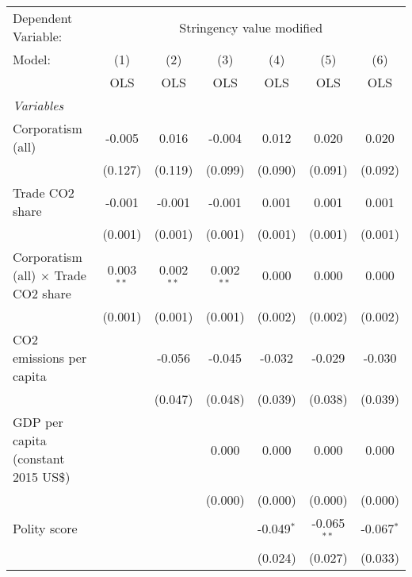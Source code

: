 
\begingroup
\centering
\begin{tabular}{lcccccc}
   \toprule
   Dependent Variable: & \multicolumn{6}{c}{Stringency value modified}\\
   Model:                                      & (1)          & (2)          & (3)          & (4)          & (5)           & (6)\\  
                                               &  OLS         & OLS          & OLS          & OLS          & OLS           & OLS\\  
   \midrule
   \emph{Variables}\\
   Corporatism (all)                           & -0.005       & 0.016        & -0.004       & 0.012        & 0.020         & 0.020\\   
                                               & (0.127)      & (0.119)      & (0.099)      & (0.090)      & (0.091)       & (0.092)\\   
   Trade CO2 share                             & -0.001       & -0.001       & -0.001       & 0.001        & 0.001         & 0.001\\   
                                               & (0.001)      & (0.001)      & (0.001)      & (0.001)      & (0.001)       & (0.001)\\   
   Corporatism (all) $\times$ Trade CO2 share  & 0.003$^{**}$ & 0.002$^{**}$ & 0.002$^{**}$ & 0.000        & 0.000         & 0.000\\   
                                               & (0.001)      & (0.001)      & (0.001)      & (0.002)      & (0.002)       & (0.002)\\   
   CO2 emissions per capita                    &              & -0.056       & -0.045       & -0.032       & -0.029        & -0.030\\   
                                               &              & (0.047)      & (0.048)      & (0.039)      & (0.038)       & (0.039)\\   
   GDP per capita (constant 2015 US\$)         &              &              & 0.000        & 0.000        & 0.000         & 0.000\\   
                                               &              &              & (0.000)      & (0.000)      & (0.000)       & (0.000)\\   
   Polity score                                &              &              &              & -0.049$^{*}$ & -0.065$^{**}$ & -0.067$^{*}$\\   
                                               &              &              &              & (0.024)      & (0.027)       & (0.033)\\   

\end{tabular}
